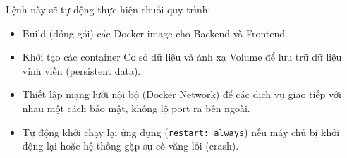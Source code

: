 Lệnh này sẽ tự động thực hiện chuỗi quy trình:
\begin{itemize}
    \item Build (đóng gói) các Docker image cho Backend và Frontend.
    \item Khởi tạo các container Cơ sở dữ liệu và ánh xạ Volume để lưu trữ dữ liệu vĩnh viễn (persistent data).
    \item Thiết lập mạng lưới nội bộ (Docker Network) để các dịch vụ giao tiếp với nhau một cách bảo mật, không lộ port ra bên ngoài.
    \item Tự động khởi chạy lại ứng dụng (\texttt{restart: always}) nếu máy chủ bị khởi động lại hoặc hệ thống gặp sự cố văng lỗi (crash).
\end{itemize}

